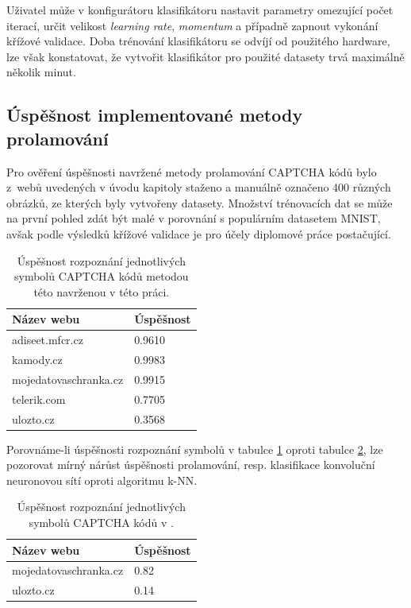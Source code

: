 \documentclass[
  field=ainfp,
  master=true,
  biblatex,
  sourcecodes=false,
  theorems=false,
  glossaries,
  index
]{kidiplom}
\begin{document}
Uživatel může v konfigurátoru klasifikátoru nastavit parametry omezující počet iterací, určit velikost \textit{learning rate}, \textit{momentum} a případně zapnout vyko\-nání křížové validace. Doba trénování klasifikátoru se odvíjí od použitého hardware, lze však konstatovat, že vytvořit klasifikátor pro použité datasety trvá maximálně několik minut.

\subsection{Úspěšnost implementované metody prolamování}
Pro ověření úspěšnosti navržené metody prolamování CAPTCHA kódů bylo z~webů uvedených v úvodu kapitoly staženo a manuálně označeno 400 různých obrázků, ze kterých byly vytvořeny datasety. Množství trénovacích dat se může na první pohled zdát být malé v porovnání s populárním datasetem MNIST, avšak podle výsledků křížové validace je pro účely diplomové práce postačující.  

\begin{table}[H]
\centering
\begin{tabular}{|l|l|}
\hline
\textbf{Název webu} & \textbf{Úspěšnost}
\\ \hline
adiseet.mfcr.cz & 0.9610
\\ \hline
kamody.cz & 0.9983
\\ \hline
mojedatovaschranka.cz & 0.9915
\\ \hline
telerik.com & 0.7705
\\ \hline
ulozto.cz & 0.3568
\\ \hline
\end{tabular}
\caption{Úspěšnost rozpoznání jednotlivých symbolů CAPTCHA kódů metodou této navrženou v této práci.}
\label{succesful_rate_mine}
\end{table}

Porovnáme-li úspěšnosti rozpoznání symbolů v tabulce \ref{succesful_rate_mine} oproti tabulce \ref{succesful_rate_mimic}, lze pozorovat mírný nárůst úspěšnosti prolamování, resp. klasifikace konvoluční neuronovou sítí oproti algoritmu k-NN.

\begin{table}[H]
\centering
\begin{tabular}{|l|l|}
\hline
\textbf{Název webu} & \textbf{Úspěšnost}
\\ \hline
mojedatovaschranka.cz & 0.82
\\ \hline
ulozto.cz & 0.14
\\ \hline
\end{tabular}
\caption{Úspěšnost rozpoznání jednotlivých symbolů CAPTCHA kódů v \citep{Kopp2016HowTM}.}
\label{succesful_rate_mimic}
\end{table}
\end{document}
